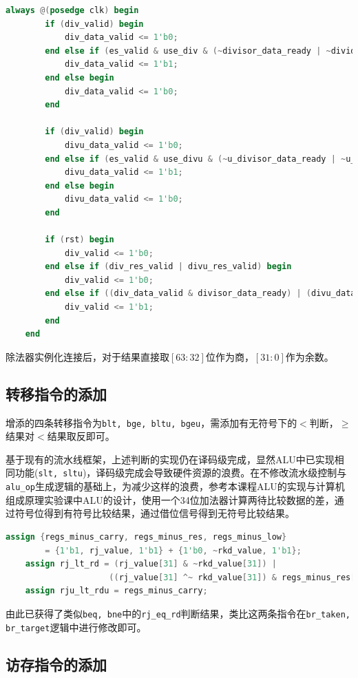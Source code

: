 \documentclass[UTF-8,twoside,c5size]{ctexart}
\begin{document}
	\begin{lstlisting}[language=verilog]
	always @(posedge clk) begin
		if (div_valid) begin
			div_data_valid <= 1'b0;
		end else if (es_valid & use_div & (~divisor_data_ready | ~dividend_data_ready)) begin
			div_data_valid <= 1'b1;
		end else begin
			div_data_valid <= 1'b0;
		end
		
		if (div_valid) begin
			divu_data_valid <= 1'b0;
		end else if (es_valid & use_divu & (~u_divisor_data_ready | ~u_dividend_data_ready)) begin
			divu_data_valid <= 1'b1;
		end else begin
			divu_data_valid <= 1'b0;
		end
		
		if (rst) begin
			div_valid <= 1'b0;
		end else if (div_res_valid | divu_res_valid) begin
			div_valid <= 1'b0;
		end else if ((div_data_valid & divisor_data_ready) | (divu_data_valid & u_divisor_data_ready)) begin
			div_valid <= 1'b1;
		end
	end
	\end{lstlisting}

	除法器实例化连接后，对于结果直接取$[63:32]$位作为商，$[31:0]$作为余数。
	
	\subsection{转移指令的添加}
	增添的四条转移指令为\texttt{blt, bge, bltu, bgeu}，需添加有无符号下的$ < $判断，$ \geqslant $结果对$ < $结果取反即可。
	
	基于现有的流水线框架，上述判断的实现仍在译码级完成，显然ALU中已实现相同功能(\texttt{slt, sltu})，译码级完成会导致硬件资源的浪费。在不修改流水级控制与\texttt{alu\_op}生成逻辑的基础上，为减少这样的浪费，参考本课程ALU的实现与计算机组成原理实验课中ALU的设计，使用一个34位加法器计算两待比较数据的差，通过符号位得到有符号比较结果，通过借位信号得到无符号比较结果。
	
	\begin{lstlisting}[language=verilog]
	assign {regs_minus_carry, regs_minus_res, regs_minus_low}
		= {1'b1, rj_value, 1'b1} + {1'b0, ~rkd_value, 1'b1};
	assign rj_lt_rd = (rj_value[31] & ~rkd_value[31]) |
					 ((rj_value[31] ^~ rkd_value[31]) & regs_minus_res[31]);
	assign rju_lt_rdu = regs_minus_carry;
	\end{lstlisting}

	由此已获得了类似\texttt{beq, bne}中的\texttt{rj\_eq\_rd}判断结果，类比这两条指令在\texttt{br\_taken, br\_target}逻辑中进行修改即可。
	
	\subsection{访存指令的添加}
	
\end{document}
